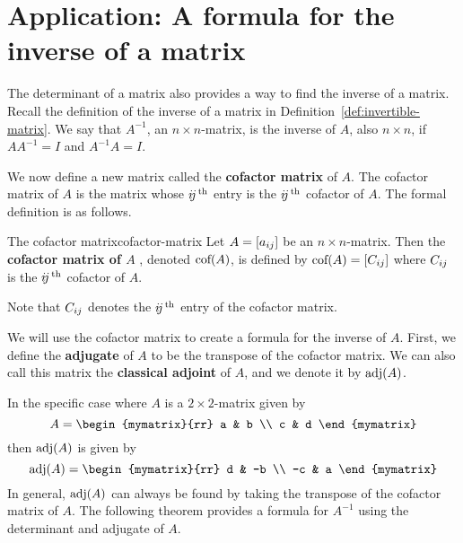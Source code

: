 \section{Application: A formula for the inverse of a matrix}

The determinant of a matrix also provides a way to find the inverse of
a matrix.  Recall the definition of the inverse of a matrix in
Definition~\ref{def:invertible-matrix}.  We say that $A^{-1}$, an
$n \times n$-matrix, is the inverse of $A$, also $n \times n$, if
$AA^{-1} = I$ and $A^{-1}A=I$.

We now define a new matrix called the \textbf{cofactor matrix} of $A$.
The cofactor matrix of $A$ is the matrix whose $\ijth$ entry is the
$\ijth$ cofactor of $A$.  The formal definition is as follows.

\begin{definition}{The cofactor matrix}{cofactor-matrix}
  Let $A=\mat{a_{ij}}$ be an $n\times n$-matrix. Then the
  \textbf{cofactor matrix of $A$}%
  , denoted $\func{cof}(A)$, is defined by
  $\func{cof}(A) =\mat{ \cofactor{A}{ij}} $ where $\cofactor{A}{ij}$ is the
  $\ijth$ cofactor of $A$.
\end{definition}

Note that $\cofactor{A}{ij}$ denotes the $\ijth$ entry of the cofactor
matrix.

We will use the cofactor matrix to create a formula for the inverse of
$A$. First, we define the \textbf{adjugate}%
 of $A$ to be the transpose of the cofactor matrix. We
can also call this matrix the \textbf{classical adjoint}%
 of $A$, and we denote it by
$\adj (A)$.

In the specific case where $A$ is a $2 \times 2$-matrix given by
\begin{equation*}
  A = \begin{mymatrix}{rr}
    a & b \\
    c & d
  \end{mymatrix}
\end{equation*}
then $\adj(A)$ is given by
\begin{equation*}
  \adj(A) = 
  \begin{mymatrix}{rr}
    d & -b \\
    -c & a
  \end{mymatrix}
\end{equation*}
In general, $\adj(A)$ can always be found by taking the
transpose of the cofactor matrix of $A$. The following theorem
provides a formula for $A^{-1}$ using the determinant and adjugate of
$A$.

